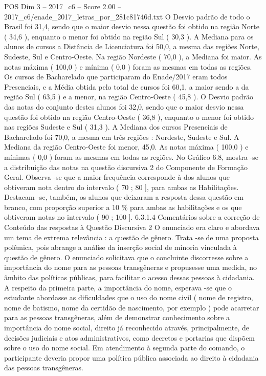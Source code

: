 \begin{textsample}{POS Dim 3 – 2017\_c6 – Score 2.00 – 2017\_c6/enade\_2017\_letras\_por\_281c81746d.txt}
O Desvio padrão de todo o Brasil foi 31,4, sendo que o maior desvio nessa questão foi obtido na região Norte ( 34,6 ), enquanto o menor foi obtido na região Sul ( 30,3 ).
A Mediana para os alunos de cursos a Distância de Licenciatura foi 50,0, a mesma das regiões Norte, Sudeste, Sul e Centro-Oeste.
Na região Nordeste ( 70,0 ), a Mediana foi maior.
As notas máxima ( 100,0 ) e mínima ( 0,0 ) foram as mesmas em todas as regiões.
Os cursos de Bacharelado que participaram do Enade/2017 eram todos Presenciais, e a Média obtida pelo total de cursos foi 60,1, a maior sendo a da região Sul ( 63,5 ) e a menor, na região Centro-Oeste ( 45,8 ).
O Desvio padrão das notas do conjunto destes alunos foi 32,0, sendo que o maior desvio nessa questão foi obtido na região Centro-Oeste ( 36,8 ), enquanto o menor foi obtido nas regiões Sudeste e Sul ( 31,3 ).
A Mediana dos cursos Presenciais de Bacharelado foi 70,0, a mesma em três regiões : Nordeste, Sudeste e Sul.
A Mediana da região Centro-Oeste foi menor, 45,0.
As notas máxima ( 100,0 ) e mínimas ( 0,0 ) foram as mesmas em todas as regiões.
No Gráfico 6.8, mostra -se a distribuição das notas na questão discursiva 2 do Componente de Formação Geral.
Observa -se que a maior frequência corresponde à dos alunos que obtiveram nota dentro do intervalo ( 70 ; 80 ], para ambas as Habilitações.
Destacam -se, também, os alunos que deixaram a resposta dessa questão em branco, com proporção superior a 10 \% para ambas as habilitações e os que obtiveram notas no intervalo ( 90 ; 100 ]. 6.3.1.4 Comentários sobre a correção de Conteúdo das respostas à Questão Discursiva 2 O enunciado era claro e abordava um tema de extrema relevância : a questão de gênero.
Trata -se de uma proposta polêmica, pois abrange a análise da inserção social de minoria vinculada à questão de gênero.
O enunciado solicitava que o concluinte discorresse sobre a importância do nome para as pessoas transgêneras e propusesse uma medida, no âmbito das políticas públicas, para facilitar o acesso dessas pessoas à cidadania.
A respeito da primeira parte, a importância do nome, esperava -se que o estudante abordasse as dificuldades que o uso do nome civil ( nome de registro, nome de batismo, nome da certidão de nascimento, por exemplo ) pode acarretar para as pessoas transgêneras, além de demonstrar conhecimento sobre a importância do nome social, direito já reconhecido através, principalmente, de decisões judiciais e atos administrativos, como decretos e portarias que dispõem sobre o uso do nome social.
Em atendimento à segunda parte do comando, o participante deveria propor uma política pública associada ao direito à cidadania das pessoas transgêneras.

\end{textsample}
